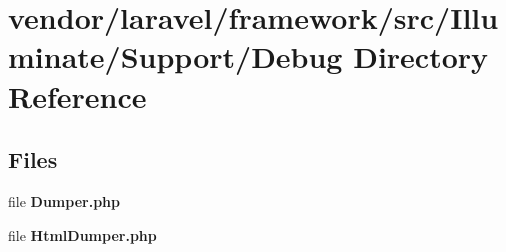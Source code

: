 \section{vendor/laravel/framework/src/\+Illuminate/\+Support/\+Debug Directory Reference}
\label{dir_291e7a8a19b2d30937341dd5cb1993b4}
\subsection*{Files}
\begin{DoxyCompactItemize}
\item 
file {\bf Dumper.\+php}
\item 
file {\bf Html\+Dumper.\+php}
\end{DoxyCompactItemize}
